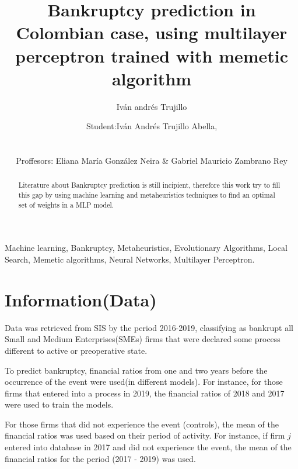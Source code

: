 \documentclass[journal]{IEEEtai}
\begin{document}
\title{Bankruptcy prediction in Colombian case, using multilayer perceptron trained with memetic algorithm} 


\author{ Iván andrés Trujillo }

\author{Student:Iván Andrés Trujillo Abella,\\

\\
\\

Proffesors: Eliana María González Neira \& Gabriel Mauricio Zambrano Rey}
\maketitle

\begin{abstract}
Literature about Bankruptcy prediction is still incipient, therefore this work try to fill this gap by using machine learning  and metaheuristics techniques to find an optimal set of  weights in a MLP model.
\end{abstract}


\begin{IEEEkeywords}
Machine learning, Bankruptcy, Metaheuristics, Evolutionary Algorithms, Local Search, Memetic algorithms, Neural Networks, Multilayer Perceptron.
\end{IEEEkeywords}





\section{Information(Data)}

Data was retrieved from SIS by the period 2016-2019, classifying as bankrupt all Small and Medium Enterprises(SMEs) firms  that were declared some process different to active or preoperative state.


To predict bankruptcy, financial ratios from one and two years before the occurrence of the event were used(in different models). For instance, for those firms that entered into a process in 2019,  the financial ratios of 2018 and 2017 were used to train the models.


For those firms that did not experience the event (controls), the mean of the financial ratios was used based on their period of activity. For instance, if firm $j$ entered into database in 2017 and did not experience the event, the mean of the financial ratios for the period (2017 - 2019) was used.
\end{document}
